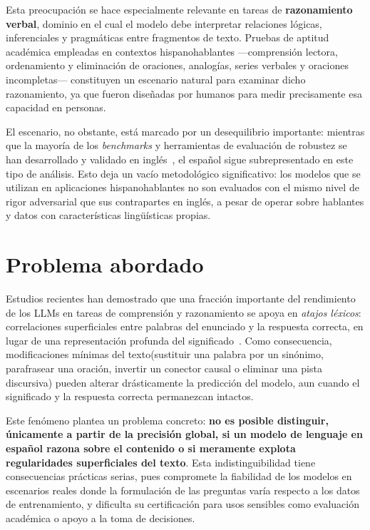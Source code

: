 \documentclass[11pt]{article}
\begin{document}
Esta preocupación se hace especialmente relevante en tareas de
\textbf{razonamiento verbal}, dominio en el cual el modelo debe interpretar
relaciones lógicas, inferenciales y pragmáticas entre fragmentos de texto.
Pruebas de aptitud académica empleadas en contextos hispanohablantes
—comprensión lectora, ordenamiento y eliminación de oraciones, analogías,
series verbales y oraciones incompletas— constituyen un escenario natural
para examinar dicho razonamiento, ya que fueron diseñadas por humanos para
medir precisamente esa capacidad en personas.

El escenario, no obstante, está marcado por un desequilibrio importante:
mientras que la mayoría de los \textit{benchmarks} y herramientas de
evaluación de robustez se han desarrollado y validado en
inglés~\citep{jia-liang-2017-adversarial,jin-etal-2020-bert,ribeiro-etal-2020-checklist},
el español sigue subrepresentado en este tipo de análisis.
Esto deja un vacío metodológico significativo: los modelos que se utilizan
en aplicaciones hispanohablantes no son evaluados con el mismo nivel de
rigor adversarial que sus contrapartes en inglés, a pesar de operar sobre
hablantes y datos con características lingüísticas propias.

\section{Problema abordado}
\label{sec:problem}

Estudios recientes han demostrado que una fracción importante del rendimiento
de los LLMs en tareas de comprensión y razonamiento se apoya en
\textit{atajos léxicos}: correlaciones superficiales entre palabras del
enunciado y la respuesta correcta, en lugar de una representación profunda
del significado~\citep{mccoy-etal-2019-right,gardner-etal-2020-evaluating}.
Como consecuencia, modificaciones mínimas del texto(sustituir una palabra
por un sinónimo, parafrasear una oración, invertir un conector causal o
eliminar una pista discursiva) pueden alterar drásticamente la predicción
del modelo, aun cuando el significado y la respuesta correcta permanezcan
intactos.

Este fenómeno plantea un problema concreto: \textbf{no es posible distinguir,
únicamente a partir de la precisión global, si un modelo de lenguaje en
español razona sobre el contenido o si meramente explota regularidades
superficiales del texto}.
Esta indistinguibilidad tiene consecuencias prácticas serias, pues compromete
la fiabilidad de los modelos en escenarios reales donde la formulación de las
preguntas varía respecto a los datos de entrenamiento, y dificulta su
certificación para usos sensibles como evaluación académica o apoyo a la
toma de decisiones.
\end{document}
